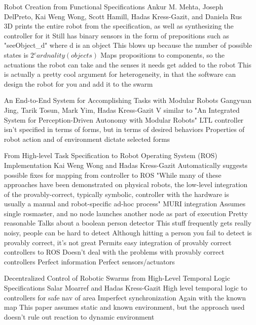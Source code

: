 Robot Creation from Functional Specifications 
Ankur M. Mehta, Joseph DelPreto, Kai Weng Wong, Scott Hamill, Hadas Kress-Gazit, and Daniela Rus
	3D prints the entire robot from the specification, as well as synthesizing the controller for it
	Still has binary sensors in the form of prepositions such as "seeObject\_d" where d is an object
		This blows up because the number of possible states is 2$^cardnality(objects)$
	Maps propositions to components, so the actuations the robot can take and the senses it needs get added to the robot
	This is actually a pretty cool argument for heterogeneity, in that the software can design the robot for you and add it to the swarm

An End-to-End System for Accomplishing Tasks with Modular Robots
Gangyuan Jing, Tarik Tosun, Mark Yim, Hadas Kress-Gazit
	V similar to "An Integrated System for Perception-Driven Autonomy with Modular Robots"
	LTL controller isn't specified in terms of forms, but in terms of desired behaviors
	Properties of robot action and of environment dictate selected forms
	
From High-level Task Specification to Robot Operating System (ROS) Implementation
Kai Weng Wong and Hadas Kress-Gazit
	Automatically suggests possible fixes for mapping from controller to ROS
	"While many of these approaches have been demonstrated on physical robots, the low-level integration of the provably-correct, typically symbolic, controller with the hardware is usually a manual and robot-specific ad-hoc process"
		MURI integration 
	Assumes single rosmaster, and no node launches another node as part of execution
		Pretty reasonable
	Talks about a boolean person detector
		This stuff frequently gets really noisy, people can be hard to detect
		Although hitting a person you fail to detect is provably correct, it's not great
	Permits easy integration of provably correct controllers to ROS
		Doesn't deal with the problems with provably correct controllers
			Perfect information
			Perfect sensors/actuators
			
Decentralized Control of Robotic Swarms from High-Level Temporal Logic Specifications
Salar Moarref and Hadas Kress-Gazit
	High level temporal logic to controllers for safe nav of area
	Imperfect synchronization
	Again with the known map
	This paper assumes static and known environment, but the approach used doesn't rule out reaction to dynamic environment

